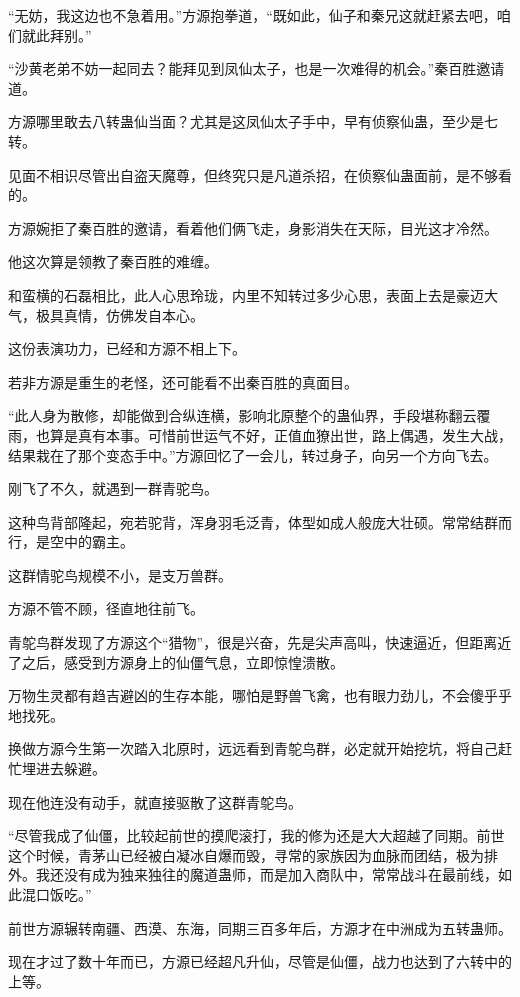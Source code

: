 \begin{this_body}
“无妨，我这边也不急着用。”方源抱拳道，“既如此，仙子和秦兄这就赶紧去吧，咱们就此拜别。”

“沙黄老弟不妨一起同去？能拜见到凤仙太子，也是一次难得的机会。”秦百胜邀请道。

方源哪里敢去八转蛊仙当面？尤其是这凤仙太子手中，早有侦察仙蛊，至少是七转。

见面不相识尽管出自盗天魔尊，但终究只是凡道杀招，在侦察仙蛊面前，是不够看的。

方源婉拒了秦百胜的邀请，看着他们俩飞走，身影消失在天际，目光这才冷然。

他这次算是领教了秦百胜的难缠。

和蛮横的石磊相比，此人心思玲珑，内里不知转过多少心思，表面上去是豪迈大气，极具真情，仿佛发自本心。

这份表演功力，已经和方源不相上下。

若非方源是重生的老怪，还可能看不出秦百胜的真面目。

“此人身为散修，却能做到合纵连横，影响北原整个的蛊仙界，手段堪称翻云覆雨，也算是真有本事。可惜前世运气不好，正值血獠出世，路上偶遇，发生大战，结果栽在了那个变态手中。”方源回忆了一会儿，转过身子，向另一个方向飞去。

刚飞了不久，就遇到一群青驼鸟。

这种鸟背部隆起，宛若驼背，浑身羽毛泛青，体型如成人般庞大壮硕。常常结群而行，是空中的霸主。

这群情驼鸟规模不小，是支万兽群。

方源不管不顾，径直地往前飞。

青鸵鸟群发现了方源这个“猎物”，很是兴奋，先是尖声高叫，快速逼近，但距离近了之后，感受到方源身上的仙僵气息，立即惊惶溃散。

万物生灵都有趋吉避凶的生存本能，哪怕是野兽飞禽，也有眼力劲儿，不会傻乎乎地找死。

换做方源今生第一次踏入北原时，远远看到青鸵鸟群，必定就开始挖坑，将自己赶忙埋进去躲避。

现在他连没有动手，就直接驱散了这群青鸵鸟。

“尽管我成了仙僵，比较起前世的摸爬滚打，我的修为还是大大超越了同期。前世这个时候，青茅山已经被白凝冰自爆而毁，寻常的家族因为血脉而团结，极为排外。我还没有成为独来独往的魔道蛊师，而是加入商队中，常常战斗在最前线，如此混口饭吃。”

前世方源辗转南疆、西漠、东海，同期三百多年后，方源才在中洲成为五转蛊师。

现在才过了数十年而已，方源已经超凡升仙，尽管是仙僵，战力也达到了六转中的上等。


\end{this_body}
